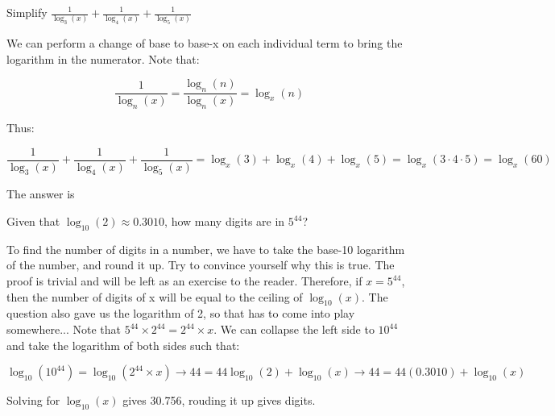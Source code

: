 \begin{question}

Simplify $\frac{1}{\log_3(x)} + \frac{1}{\log_4(x)} + \frac{1}{\log_5(x)}$

\end{question}

\begin{solution}
We can perform a change of base to base-x on each individual term to bring the logarithm in the numerator. Note that:

$$\frac{1}{\log_n(x)} = \frac{\log_n(n)}{\log_n(x)} = \log_x(n)$$

Thus:

$$
\frac{1}{\log_3(x)} + \frac{1}{\log_4(x)} + \frac{1}{\log_5(x)} =
\log_x(3) + \log_x(4) + \log_x(5) =
\log_x(3 \cdot 4 \cdot 5) =
\log_x(60)
$$

The answer is 

\newpage
\end{solution}

\begin{question}

Given that $\log_{10}(2) \approx 0.3010$, how many digits are in $5^44$?

\end{question}

\begin{solution}

To find the number of digits in a number, we have to take the base-10 logarithm of the number, and round it up. Try to convince yourself why this is true. The proof is trivial and will be left as an exercise to the reader.
\newline\newline
Therefore, if $x = 5^{44}$, then the number of digits of x will be equal to the ceiling of $\log_{10}(x)$. The question also gave us the logarithm of 2, so that has to come into play somewhere... Note that  $5^{44} \times 2^{44} = 2^{44} \times x$. We can collapse the left side to $10^{44}$ and take the logarithm of both sides such that:

$$
  \log_{10}(10^{44}) = \log_{10}(2^{44} \times x) \rightarrow
  44 = 44\log_{10}(2) + \log_{10}(x) \rightarrow
  44 = 44(0.3010) + \log_{10}(x)
$$

Solving for $\log_{10}(x)$ gives 30.756, rouding it up gives  digits.
\end{solution}

